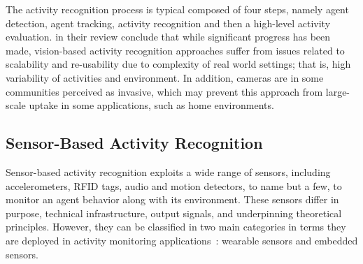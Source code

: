 The activity recognition process is typical composed of four steps, namely agent detection, agent tracking, activity recognition and then a high-level activity evaluation. \cite{Chen2011} in their review conclude that while 
significant progress has been made, vision-based activity recognition approaches suffer from issues related to scalability and re-usability due to complexity of real world settings; that is, high variability of activities and environment. In addition, cameras are in some communities perceived as invasive, which may prevent this approach from large-scale uptake in some applications, such as home environments.



%
\subsection{Sensor-Based Activity Recognition}

Sensor-based activity recognition exploits a wide range of sensors, including accelerometers, RFID tags, audio and motion detectors, to name but a few, to monitor an agent behavior along with its environment. These sensors differ in purpose, technical infrastructure, output signals, and underpinning theoretical principles. However, they can be classified in two main categories in terms they are deployed in activity monitoring applications~\citep{Chen2012}: wearable sensors and embedded sensors.



